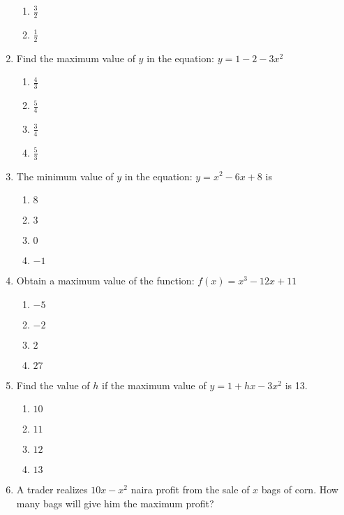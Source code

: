 \begin{multicols}{2}
\begin{enumerate}[label={\arabic*.}]
\begin{enumerate}[label={\Alph*.}]
            \item \(\frac{3}{2}\)
            \item \(\frac{1}{2}\)
        \end{enumerate}
  \item Find the maximum value of \(y\) in the equation: \(y = 1 - 2 - 3x^2\)
        \begin{enumerate}[label={\Alph*.}]
            \item \(\frac{4}{3}\)
            \item \(\frac{5}{4}\)
            \item \(\frac{3}{4}\)
            \item \(\frac{5}{3}\)
        \end{enumerate}
  \item The minimum value of \(y\) in the equation: \(y = x^2 - 6x + 8\) is
        \begin{enumerate}[label={\Alph*.}]
            \item \(8\)
            \item \(3\)
            \item \(0\)
            \item \(-1\)
        \end{enumerate}
  \item Obtain a maximum value of the function: \(f(x) = x^3 - 12x + 11\)
        \begin{enumerate}[label={\Alph*.}]
            \item \(-5\)
            \item \(-2\)
            \item \(2\)
            \item \(27\)
        \end{enumerate}
  \item Find the value of \(h\) if the maximum value of \(y = 1 + hx - 3x^2\) is 13.
        \begin{enumerate}[label={\Alph*.}]
            \item \(10\)
            \item \(11\)
            \item \(12\)
            \item \(13\)
        \end{enumerate}
  \item A trader realizes \(10x - x^2\) naira profit from the sale of \(x\) bags of corn. How many bags will give him the maximum profit?
        \begin{enumerate}[label={\Alph*.}]

\end{enumerate}
\end{enumerate}
\end{multicols}
